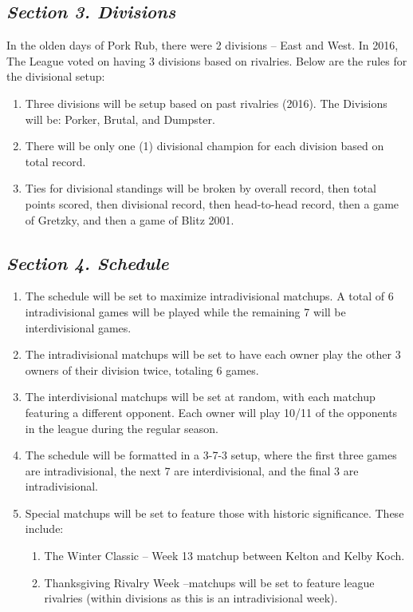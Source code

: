 \documentclass{article}
\begin{document}
    \subsection{\textit{Section 3. Divisions}}
    In the olden days of Pork Rub, there were 2 divisions – East and West. In 2016, The League voted on having 3 divisions based on rivalries. Below are the rules for the divisional setup:
    \begin{enumerate}[label=\Alph*)]
        \item Three divisions will be setup based on past rivalries (2016). The Divisions will be: Porker, Brutal, and Dumpster.
        \item There will be only one (1) divisional champion for each division based on total record.
        \item Ties for divisional standings will be broken by overall record, then total points scored, then divisional record, then head-to-head record, then a game of Gretzky, and then a game of Blitz 2001.
    \end{enumerate}
    \subsection{\textit{Section 4. Schedule}}
    \begin{enumerate}[label=\Alph*)]
        \item The schedule will be set to maximize intradivisional matchups. A total of 6 intradivisional games will be played while the remaining 7 will be interdivisional games.
        \item The intradivisional matchups will be set to have each owner play the other 3 owners of their division twice, totaling 6 games.
        \item The interdivisional matchups will be set at random, with each matchup featuring a different opponent. Each owner will play 10/11 of the opponents in the league during the regular season.
        \item The schedule will be formatted in a 3-7-3 setup, where the first three games are intradivisional, the next 7 are interdivisional, and the final 3 are intradivisional.
        \item Special matchups will be set to feature those with historic significance. These include:
        \begin{enumerate}[label=\roman*)]
            \item The Winter Classic – Week 13 matchup between Kelton and Kelby Koch.
            \item Thanksgiving Rivalry Week –matchups will be set to feature league rivalries (within divisions as this is an intradivisional week).
        \end{enumerate}
    \end{enumerate}
\end{document}
